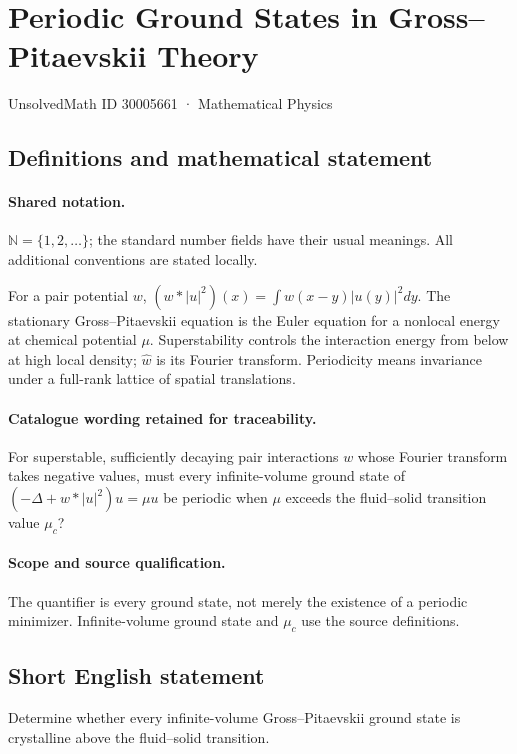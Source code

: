 \documentclass[11pt]{article}
\begin{document}
\setcounter{section}{30005660}
\section{Periodic Ground States in Gross–Pitaevskii Theory}\label{30005661}
{\small UnsolvedMath ID 30005661 · Mathematical Physics}
\subsection{Definitions and mathematical statement}

\paragraph{Shared notation.}$\mathbb N=\{1,2,\ldots\}$; the standard number fields have their usual meanings. All additional conventions are stated locally.


For a pair potential $w$, $(w*|u|^2)(x)=\int w(x-y)|u(y)|^2dy$. The stationary Gross--Pitaevskii equation is the Euler equation for a nonlocal energy at chemical potential $\mu$. Superstability controls the interaction energy from below at high local density; $\widehat w$ is its Fourier transform. Periodicity means invariance under a full-rank lattice of spatial translations.

\paragraph{Catalogue wording retained for traceability.}
For superstable, sufficiently decaying pair interactions $w$ whose Fourier transform takes negative values, must every infinite-volume ground state of $(-\Delta+w*|u|^2)u=\mu u$ be periodic when $\mu$ exceeds the fluid–solid transition value $\mu_c$?

\paragraph{Scope and source qualification.}The quantifier is every ground state, not merely the existence of a periodic minimizer. Infinite-volume ground state and $\mu_c$ use the source definitions.
\subsection{Short English statement}
Determine whether every infinite-volume Gross--Pitaevskii ground state is crystalline above the fluid--solid transition.
\end{document}
